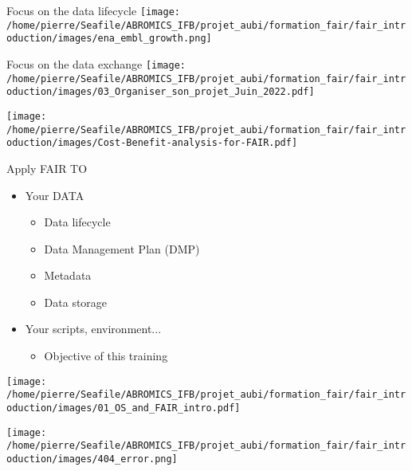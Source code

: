 \begin{frame}{Focus on the data lifecycle}
\centering\texttt{[image: /home/pierre/Seafile/ABROMICS\_IFB/projet\_aubi/formation\_fair/fair\_introduction/images/ena\_embl\_growth.png]}
\end{frame}

\begin{frame}{Focus on the data exchange}
\centering\texttt{[image: /home/pierre/Seafile/ABROMICS\_IFB/projet\_aubi/formation\_fair/fair\_introduction/images/03\_Organiser\_son\_projet\_Juin\_2022.pdf]}
\end{frame}

\begin{frame}
\centering\texttt{[image: /home/pierre/Seafile/ABROMICS\_IFB/projet\_aubi/formation\_fair/fair\_introduction/images/Cost-Benefit-analysis-for-FAIR.pdf]}
\end{frame}

\begin{frame}
\begin{block}{Apply FAIR TO}
\begin{itemize}
\item Your DATA
	\begin{itemize}
	\item Data lifecycle
	\item Data Management Plan (DMP)
	\item Metadata
	\item Data storage
	\end{itemize}
\item Your scripts, environment...
	\begin{itemize}
	\item Objective of this training
	\end{itemize}
\end{itemize}
\end{block}
\end{frame}


\begin{frame}
\centering\texttt{[image: /home/pierre/Seafile/ABROMICS\_IFB/projet\_aubi/formation\_fair/fair\_introduction/images/01\_OS\_and\_FAIR\_intro.pdf]}
\end{frame}


\begin{frame}
\centering\texttt{[image: /home/pierre/Seafile/ABROMICS\_IFB/projet\_aubi/formation\_fair/fair\_introduction/images/404\_error.png]}
\end{frame}


